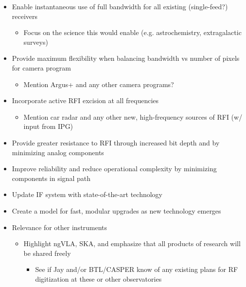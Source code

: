 \documentclass[10pt]{myNSF}
\begin{document}
\begin{itemize}
\item{Enable instantaneous use of full bandwidth for all existing
    (single-feed?) receivers}
  \begin{itemize}
  \item{Focus on the science this would enable (e.g. astrochemistry,
      extragalactic surveys)}
  \end{itemize}
\item{Provide maximum flexibility when balancing bandwidth vs number
    of pixels for camera program}
  \begin{itemize}
  \item{Mention Argus+ and any other camera programs?}
  \end{itemize}
\item{Incorporate active RFI excision at all frequencies}
  \begin{itemize}
  \item{Mention car radar and any other new, high-frequency sources
      of RFI (w/ input from IPG)}
  \end{itemize}
\item{Provide greater resistance to RFI through increased bit depth
    and by minimizing analog components}
\item{Improve reliability and reduce operational complexity by
    minimizing components in signal path}
\item{Update IF system with state-of-the-art technology}
\item{Create a model for fast, modular upgrades as new technology
    emerges}
\end{itemize}


\begin{itemize}
\item{Relevance for other instruments}
  \begin{itemize}
  \item{Highlight ngVLA, SKA, and emphasize that all products of
      research will be shared freely}
    \begin{itemize}
    \item{See if Jay and/or BTL/CASPER know of any existing plans for
        RF digitization at these or other observatories}
    \end{itemize}
  \end{itemize}
\end{itemize}
\end{document}
